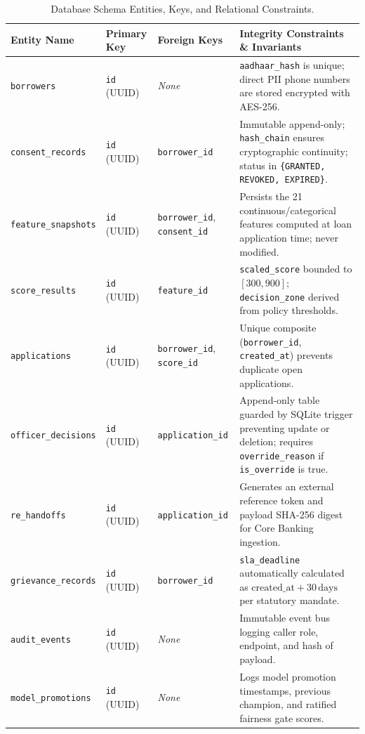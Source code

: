 \documentclass[11pt,a4paper,oneside]{report}
\begin{document}
\begin{table}[H]
\centering
\small
\renewcommand{\arraystretch}{1.15}
\begin{tabularx}{\textwidth}{l p{2.8cm} p{2.5cm} X}
  \toprule
  \textbf{Entity Name} & \textbf{Primary Key} & \textbf{Foreign Keys} & \textbf{Integrity Constraints \& Invariants} \\
  \midrule
  \texttt{borrowers} & \texttt{id} (UUID) & \textit{None} & \texttt{aadhaar\_hash} is unique; direct PII phone numbers are stored encrypted with AES-256. \\
  \texttt{consent\_records} & \texttt{id} (UUID) & \texttt{borrower\_id} & Immutable append-only; \texttt{hash\_chain} ensures cryptographic continuity; status in \texttt{\{GRANTED, REVOKED, EXPIRED\}}. \\
  \texttt{feature\_snapshots} & \texttt{id} (UUID) & \texttt{borrower\_id}, \texttt{consent\_id} & Persists the 21 continuous/categorical features computed at loan application time; never modified. \\
  \texttt{score\_results} & \texttt{id} (UUID) & \texttt{feature\_id} & \texttt{scaled\_score} bounded to $[300, 900]$; \texttt{decision\_zone} derived from policy thresholds. \\
  \texttt{applications} & \texttt{id} (UUID) & \texttt{borrower\_id}, \texttt{score\_id} & Unique composite (\texttt{borrower\_id}, \texttt{created\_at}) prevents duplicate open applications. \\
  \texttt{officer\_decisions} & \texttt{id} (UUID) & \texttt{application\_id} & Append-only table guarded by SQLite trigger preventing update or deletion; requires \texttt{override\_reason} if \texttt{is\_override} is true. \\
  \texttt{re\_handoffs} & \texttt{id} (UUID) & \texttt{application\_id} & Generates an external reference token and payload SHA-256 digest for Core Banking ingestion. \\
  \texttt{grievance\_records} & \texttt{id} (UUID) & \texttt{borrower\_id} & \texttt{sla\_deadline} automatically calculated as $\text{created\_at} + 30\,\text{days}$ per statutory mandate. \\
  \texttt{audit\_events} & \texttt{id} (UUID) & \textit{None} & Immutable event bus logging caller role, endpoint, and hash of payload. \\
  \texttt{model\_promotions} & \texttt{id} (UUID) & \textit{None} & Logs model promotion timestamps, previous champion, and ratified fairness gate scores. \\
  \bottomrule
\end{tabularx}
\caption{Database Schema Entities, Keys, and Relational Constraints.}
\label{tab:entities_overview}
\end{table}
\end{document}
